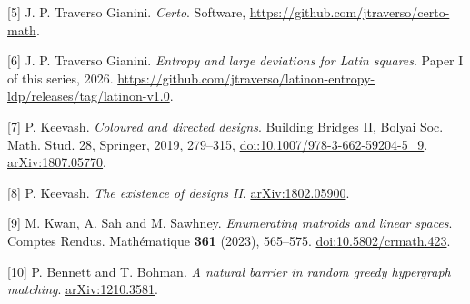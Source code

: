 \documentclass[english,11pt,a4paper]{article}
\begin{document}
{[}5{]} J. P. Traverso Gianini. \emph{Certo}. Software, \url{https://github.com/jtraverso/certo-math}.

{[}6{]} J. P. Traverso Gianini. \emph{Entropy and large deviations for Latin squares}. Paper I of this series, 2026. \url{https://github.com/jtraverso/latinon-entropy-ldp/releases/tag/latinon-v1.0}.

{[}7{]} P. Keevash. \emph{Coloured and directed designs}. Building Bridges II, Bolyai Soc. Math. Stud. 28, Springer, 2019, 279--315, \href{https://doi.org/10.1007/978-3-662-59204-5_9}{doi:10.1007/978-3-662-59204-5\_9}. \href{https://arxiv.org/abs/1807.05770}{arXiv:1807.05770}.

{[}8{]} P. Keevash. \emph{The existence of designs II}. \href{https://arxiv.org/abs/1802.05900}{arXiv:1802.05900}.

{[}9{]} M. Kwan, A. Sah and M. Sawhney. \emph{Enumerating matroids and linear spaces}. Comptes Rendus. Mathématique \textbf{361} (2023), 565--575. \href{https://doi.org/10.5802/crmath.423}{doi:10.5802/crmath.423}.

{[}10{]} P. Bennett and T. Bohman. \emph{A natural barrier in random greedy hypergraph matching}. \href{https://arxiv.org/abs/1210.3581}{arXiv:1210.3581}.
\end{document}
